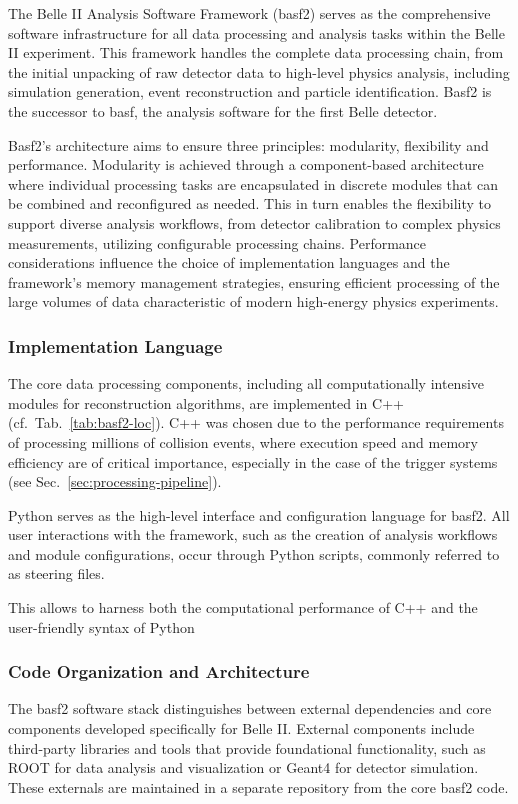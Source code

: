 The Belle II Analysis Software Framework (basf2) serves as the comprehensive software infrastructure for all data processing and analysis tasks within the Belle II experiment.
This framework handles the complete data processing chain, from the initial unpacking of raw detector data to high-level physics analysis, including simulation generation, event reconstruction and particle identification.
Basf2 is the successor to basf, the analysis software for the first Belle detector.

Basf2's architecture aims to ensure three principles: modularity, flexibility and performance.
Modularity is achieved through a component-based architecture where individual processing tasks are encapsulated in discrete modules that can be combined and reconfigured as needed.
This in turn enables the flexibility to support diverse analysis workflows, from detector calibration to complex physics measurements, utilizing configurable processing chains.
Performance considerations influence the choice of implementation languages and the framework's memory management strategies, ensuring efficient processing of the large volumes of data characteristic of modern high-energy physics experiments.

\subsubsection{Implementation Language}
The core data processing components, including all computationally intensive modules for reconstruction algorithms, are implemented in C++ (cf.\ Tab.\ \ref{tab:basf2-loc}).
C++ was chosen due to the performance requirements of processing millions of collision events, where execution speed and memory efficiency are of critical importance, especially in the case of the trigger systems (see Sec.\ \ref{sec:processing-pipeline}).

Python serves as the high-level interface and configuration language for basf2.
All user interactions with the framework, such as the creation of analysis workflows and module configurations, occur through Python scripts, commonly referred to as steering files.

This allows to harness both the computational performance of C++ and the user-friendly syntax of Python

\subsubsection{Code Organization and Architecture}
The basf2 software stack distinguishes between external dependencies and core components developed specifically for Belle II.
External components include third-party libraries and tools that provide foundational functionality, such as ROOT \cite{root} for data analysis and visualization or Geant4 \cite{geant4} for detector simulation.
These externals are maintained in a separate repository from the core basf2 code.

